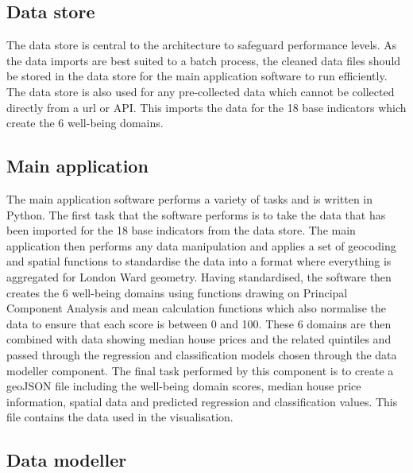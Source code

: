 
\subsection{Data store}
The data store is central to the architecture to safeguard performance levels. As the data imports are best suited to a batch process, the cleaned data files should be stored in the data store for the main application software to run efficiently. The data store is also used for any pre-collected data which cannot be collected directly from a url or API. This imports the data for the 18 base indicators which create the 6 well-being domains.


\subsection{Main application}
The main application software performs a variety of tasks and is written in Python. The first task that the software performs is to take the data that has been imported for the 18 base indicators from the data store. The main application then performs any data manipulation and applies a set of geocoding and spatial functions to standardise the data into a format where everything is aggregated for London Ward geometry. Having standardised, the software then creates the 6 well-being domains using functions drawing on Principal Component Analysis and mean calculation functions which also normalise the data to ensure that each score is between 0 and 100.
These 6 domains are then combined with data showing median house prices and the related quintiles and passed through the regression and classification models chosen through the data modeller component. The final task performed by this component is to create a geoJSON file including the well-being domain scores, median house price information, spatial data and predicted regression and classification values. This file contains the data used in the visualisation.


\subsection{Data modeller}


